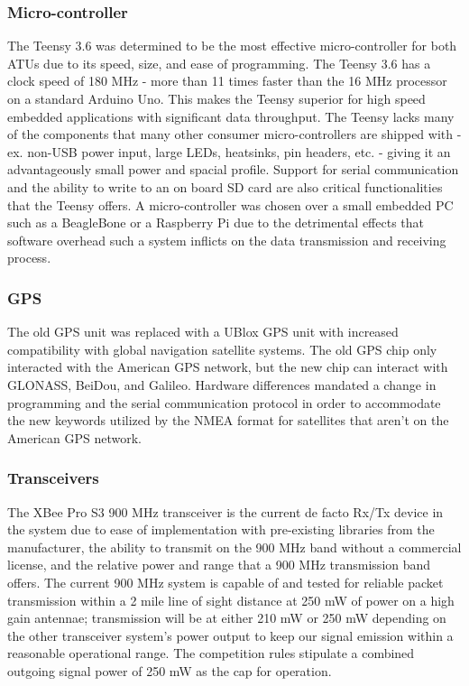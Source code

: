 \documentclass[journal,10pt,draftclsnofoot,onecolumn,compsoc]{IEEEtran} \usepackage[margin=0.75in]{geometry}
\begin{document}
\subsubsection{Micro-controller}
The Teensy 3.6 was determined to be the most effective micro-controller for both ATUs due to its speed, size, and ease of programming. The Teensy 3.6 has a clock speed of 180 MHz - more than 11 times faster than the 16 MHz processor on a standard Arduino Uno. This makes the Teensy superior for high speed embedded applications with significant data throughput. The Teensy lacks many of the components that many other consumer micro-controllers are shipped with - ex. non-USB power input, large LEDs, heatsinks, pin headers, etc. - giving it an advantageously small power and spacial profile. Support for serial communication and the ability to write to an on board SD card are also critical functionalities that the Teensy offers. A micro-controller was chosen over a small embedded PC such as a BeagleBone or a Raspberry Pi due to the detrimental effects that software overhead such a system inflicts on the data transmission and receiving process.

\subsubsection{GPS}
The old GPS unit was replaced with a UBlox GPS unit with increased compatibility with global navigation satellite systems. The old GPS chip only interacted with the American GPS network, but the new chip can interact with GLONASS, BeiDou, and Galileo. Hardware differences mandated a change in programming and the serial communication protocol in order to accommodate the new keywords utilized by the NMEA format for satellites that aren't on the American GPS network.

\subsubsection{Transceivers}
The XBee Pro S3 900 MHz transceiver is the current de facto Rx/Tx device in the system due to ease of implementation with pre-existing libraries from the manufacturer, the ability to transmit on the 900 MHz band without a commercial license, and the relative power and range that a 900 MHz transmission band offers. The current 900 MHz system is capable of and tested for reliable packet transmission within a 2 mile line of sight distance at 250 mW of power on a high gain antennae; transmission will be at either 210 mW or 250 mW depending on the other transceiver system's power output to keep our signal emission within a reasonable operational range. The competition rules stipulate a combined outgoing signal power of 250 mW as the cap for operation.\newline
\end{document}
